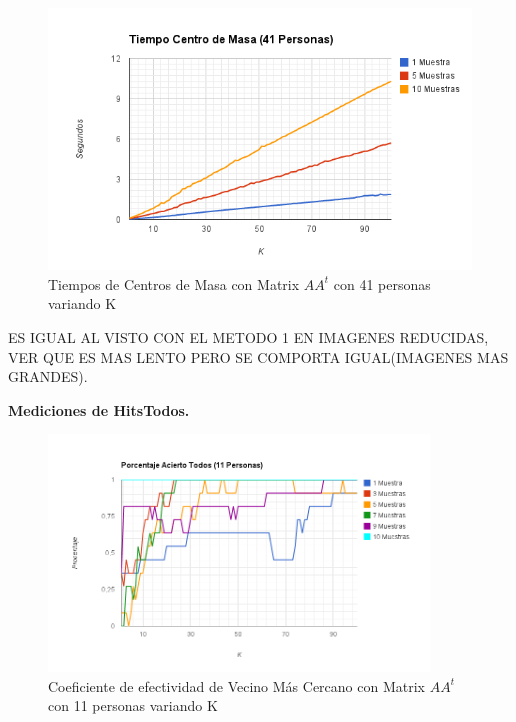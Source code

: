 \begin{figure}[H]
\includegraphics[width=1\textwidth]{img/imagef9.png}
     \caption{Tiempos de Centros de Masa con Matrix $AA^t$ con 41 personas variando K}
\end{figure}

ES IGUAL AL VISTO CON EL METODO 1 EN IMAGENES REDUCIDAS, VER QUE ES MAS LENTO PERO SE COMPORTA IGUAL(IMAGENES MAS GRANDES).

\textbf{Mediciones de HitsTodos. }

\begin{figure}[H]
\includegraphics[width=0.9\textwidth]{img/imagef10.png}
     \caption{Coeficiente de efectividad de Vecino Más Cercano con Matrix $AA^t$ con 11 personas variando K}
\end{figure}

